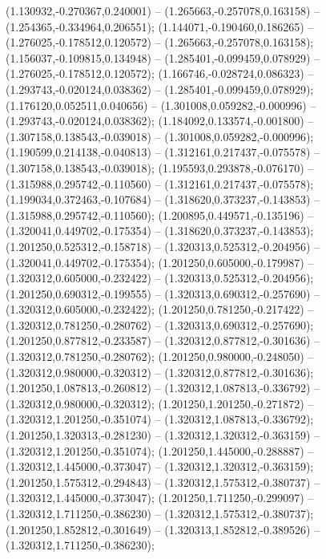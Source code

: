  (1.130932,-0.270367,0.240001) -- (1.265663,-0.257078,0.163158) -- (1.254365,-0.334964,0.206551);
 (1.144071,-0.190460,0.186265) -- (1.276025,-0.178512,0.120572) -- (1.265663,-0.257078,0.163158);
 (1.156037,-0.109815,0.134948) -- (1.285401,-0.099459,0.078929) -- (1.276025,-0.178512,0.120572);
 (1.166746,-0.028724,0.086323) -- (1.293743,-0.020124,0.038362) -- (1.285401,-0.099459,0.078929);
 (1.176120,0.052511,0.040656) -- (1.301008,0.059282,-0.000996) -- (1.293743,-0.020124,0.038362);
 (1.184092,0.133574,-0.001800) -- (1.307158,0.138543,-0.039018) -- (1.301008,0.059282,-0.000996);
 (1.190599,0.214138,-0.040813) -- (1.312161,0.217437,-0.075578) -- (1.307158,0.138543,-0.039018);
 (1.195593,0.293878,-0.076170) -- (1.315988,0.295742,-0.110560) -- (1.312161,0.217437,-0.075578);
 (1.199034,0.372463,-0.107684) -- (1.318620,0.373237,-0.143853) -- (1.315988,0.295742,-0.110560);
 (1.200895,0.449571,-0.135196) -- (1.320041,0.449702,-0.175354) -- (1.318620,0.373237,-0.143853);
 (1.201250,0.525312,-0.158718) -- (1.320313,0.525312,-0.204956) -- (1.320041,0.449702,-0.175354);
 (1.201250,0.605000,-0.179987) -- (1.320312,0.605000,-0.232422) -- (1.320313,0.525312,-0.204956);
 (1.201250,0.690312,-0.199555) -- (1.320313,0.690312,-0.257690) -- (1.320312,0.605000,-0.232422);
 (1.201250,0.781250,-0.217422) -- (1.320312,0.781250,-0.280762) -- (1.320313,0.690312,-0.257690);
 (1.201250,0.877812,-0.233587) -- (1.320312,0.877812,-0.301636) -- (1.320312,0.781250,-0.280762);
 (1.201250,0.980000,-0.248050) -- (1.320312,0.980000,-0.320312) -- (1.320312,0.877812,-0.301636);
 (1.201250,1.087813,-0.260812) -- (1.320312,1.087813,-0.336792) -- (1.320312,0.980000,-0.320312);
 (1.201250,1.201250,-0.271872) -- (1.320312,1.201250,-0.351074) -- (1.320312,1.087813,-0.336792);
 (1.201250,1.320313,-0.281230) -- (1.320312,1.320312,-0.363159) -- (1.320312,1.201250,-0.351074);
 (1.201250,1.445000,-0.288887) -- (1.320312,1.445000,-0.373047) -- (1.320312,1.320312,-0.363159);
 (1.201250,1.575312,-0.294843) -- (1.320312,1.575312,-0.380737) -- (1.320312,1.445000,-0.373047);
 (1.201250,1.711250,-0.299097) -- (1.320312,1.711250,-0.386230) -- (1.320312,1.575312,-0.380737);
 (1.201250,1.852812,-0.301649) -- (1.320313,1.852812,-0.389526) -- (1.320312,1.711250,-0.386230);
